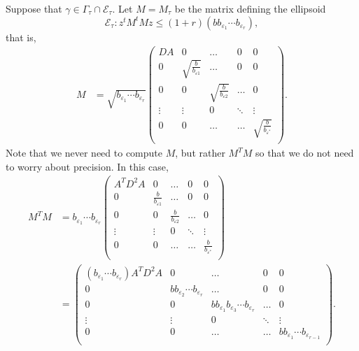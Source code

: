 %
Suppose that $\gamma\in \Gamma_\tau\cap \mathcal E_\tau$. Let $M=M_\tau$ be the matrix defining the ellipsoid 
\[\mathcal E_\tau: z^tM^tMz\leq (1 + r)(bb_{\varepsilon_1}\cdots b_{\varepsilon_r}),\]
that is,  
\begin{align*}
M &=\sqrt{b_{\varepsilon_1}\cdots b_{\varepsilon_r}}\begin{pmatrix}
	DA & 0 & \dots & 0 & 0\\
	0 & \sqrt{\frac{b}{b_{\varepsilon 1}}} & \dots & 0 & 0\\
	0 & 0  & \sqrt{\frac{b}{b_{\varepsilon 2}}} & \dots & 0\\
	\vdots & \vdots &0 &  \ddots & \vdots\\ 
	0 & 0 & \dots & \dots & \sqrt{\frac{b}{b_{\varepsilon^*}}} \\
	\end{pmatrix}.
\end{align*}	
Note that we never need to compute $M$, but rather $M^TM$ so that we do not need to worry about precision. In this case, 
\begin{align*}
M^TM &= b_{\varepsilon_1}\cdots b_{\varepsilon_r}\begin{pmatrix}
	A^TD^2A & 0 & \dots & 0 & 0\\
	0 & \frac{b}{b_{\varepsilon 1}} & \dots & 0 & 0\\
	0 & 0  & \frac{b}{b_{\varepsilon 2}} & \dots & 0\\
	\vdots & \vdots &0 &  \ddots & \vdots\\ 
	0 & 0 & \dots & \dots & \frac{b}{b_{\varepsilon^*}} \\
	\end{pmatrix}\\
	& = \begin{pmatrix}
	(b_{\varepsilon_1}\cdots b_{\varepsilon_r})A^TD^2A & 0 & \dots & 0 & 0\\
	0 & b b_{\varepsilon_2}\cdots b_{\varepsilon_r} & \dots & 0 & 0\\
	0 & 0  & bb_{\varepsilon_1}b_{\varepsilon_3}\cdots b_{\varepsilon_r} & \dots & 0\\
	\vdots & \vdots &0 &  \ddots & \vdots\\ 
	0 & 0 & \dots & \dots & bb_{\varepsilon_1}\cdots b_{\varepsilon_{r-1}} \\
	\end{pmatrix}.
\end{align*}	
	
